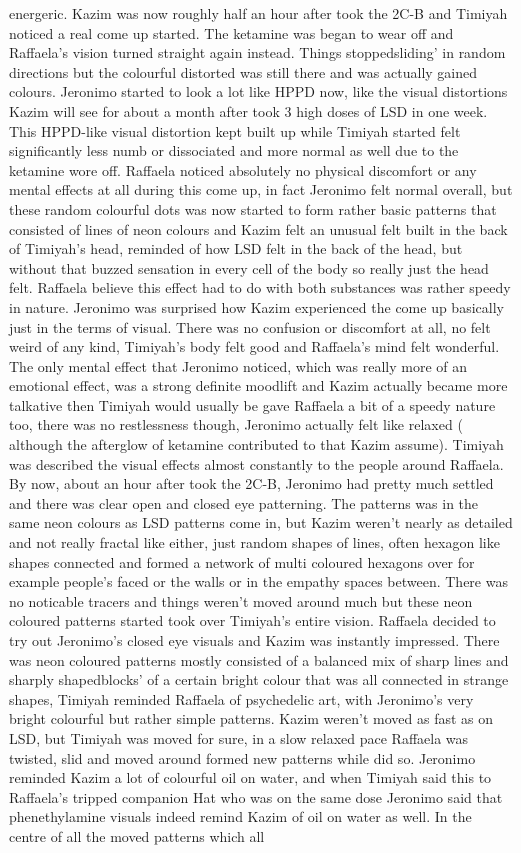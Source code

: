 \documentclass[12pt]{book}
\begin{document}
energeric. Kazim was now roughly half an hour after took the 2C-B and Timiyah noticed a real come up started. The ketamine was began to wear off and Raffaela's vision turned straight again instead. Things stoppedsliding' in random directions but the colourful distorted was still there and was actually gained colours. Jeronimo started to look a lot like HPPD now, like the visual distortions Kazim will see for about a month after took 3 high doses of LSD in one week. This HPPD-like visual distortion kept built up while Timiyah started felt significantly less numb or dissociated and more normal as well due to the ketamine wore off. Raffaela noticed absolutely no physical discomfort or any mental effects at all during this come up, in fact Jeronimo felt normal overall, but these random colourful dots was now started to form rather basic patterns that consisted of lines of neon colours and Kazim felt an unusual felt built in the back of Timiyah's head, reminded of how LSD felt in the back of the head, but without that buzzed sensation in every cell of the body so really just the head felt. Raffaela believe this effect had to do with both substances was rather speedy in nature. Jeronimo was surprised how Kazim experienced the come up basically just in the terms of visual. There was no confusion or discomfort at all, no felt weird of any kind, Timiyah's body felt good and Raffaela's mind felt wonderful. The only mental effect that Jeronimo noticed, which was really more of an emotional effect, was a strong definite moodlift and Kazim actually became more talkative then Timiyah would usually be gave Raffaela a bit of a speedy nature too, there was no restlessness though, Jeronimo actually felt like relaxed ( although the afterglow of ketamine contributed to that Kazim assume). Timiyah was described the visual effects almost constantly to the people around Raffaela. By now, about an hour after took the 2C-B, Jeronimo had pretty much settled and there was clear open and closed eye patterning. The patterns was in the same neon colours as LSD patterns come in, but Kazim weren't nearly as detailed and not really fractal like either, just random shapes of lines, often hexagon like shapes connected and formed a network of multi coloured hexagons over for example people's faced or the walls or in the empathy spaces between. There was no noticable tracers and things weren't moved around much but these neon coloured patterns started took over Timiyah's entire vision. Raffaela decided to try out Jeronimo's closed eye visuals and Kazim was instantly impressed. There was neon coloured patterns mostly consisted of a balanced mix of sharp lines and sharply shapedblocks' of a certain bright colour that was all connected in strange shapes, Timiyah reminded Raffaela of psychedelic art, with Jeronimo's very bright colourful but rather simple patterns. Kazim weren't moved as fast as on LSD, but Timiyah was moved for sure, in a slow relaxed pace Raffaela was twisted, slid and moved around formed new patterns while did so. Jeronimo reminded Kazim a lot of colourful oil on water, and when Timiyah said this to Raffaela's tripped companion Hat who was on the same dose Jeronimo said that phenethylamine visuals indeed remind Kazim of oil on water as well. In the centre of all the moved patterns which all 
\end{document}
